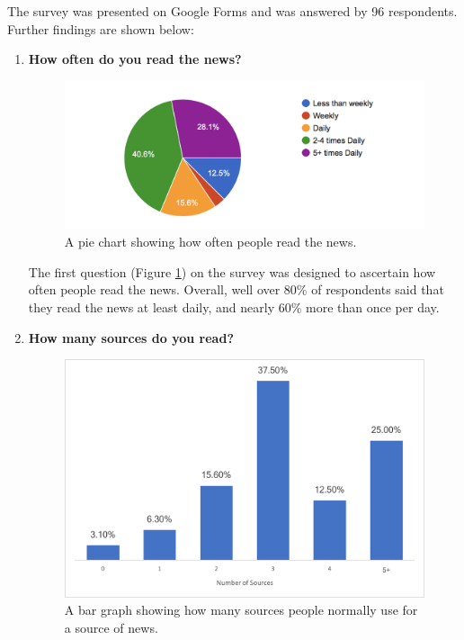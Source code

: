 \documentclass[12pt]{article}
\begin{document}
The survey was presented on Google Forms \cite{googleForms} and was answered by 96 respondents. Further findings are shown below:

\begin{enumerate}

\item \textbf{How often do you read the news?}

\begin{figure}[ht!]
  \centering
    \includegraphics[scale=0.7]{01HowOftenDoYouReadTheNews}
   \caption[Survey Graph surrounding how often news is read]{A pie chart showing how often people read the news.}
   \label{SurveyHowOftenDoYouReadTheNews}
\end{figure}

The first question (Figure \ref{SurveyHowOftenDoYouReadTheNews}) on the survey was designed to ascertain how often people read the news. Overall, well over 80\% of respondents said that they read the news at least daily, and nearly 60\% more than once per day. \\

\item \textbf{How many sources do you read?}

\begin{figure}[ht!]
  \centering
    \includegraphics[scale=0.7]{02HowManySourcesDoYouRead}
   \caption[Survey Graph asking how many sources are used]{A bar graph showing how many sources people normally use for a source of news.}
   \label{SurveySources}
\end{figure}


\end{enumerate}
\end{document}
